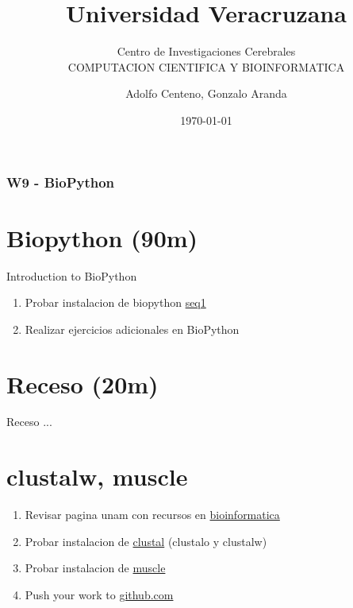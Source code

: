 \documentclass{beamer}
\begin{document}
\title{Universidad Veracruzana}  
\subtitle{Centro de Investigaciones Cerebrales\\COMPUTACION CIENTIFICA Y BIOINFORMATICA}
\author{Adolfo Centeno, Gonzalo Aranda}
\date{\today} 

\begin{frame}
\titlepage
\end{frame}

\begin{frame}\frametitle{W9 - BioPython }
\tableofcontents
\end{frame} 


\section{Biopython (90m) }

\begin{frame}

Introduction to BioPython

\begin{enumerate}

\item

	Probar instalacion de biopython \href{https://github.com/adsoftsito/python/blob/master/w9/seq1.py}{seq1} 
	
\item
	Realizar ejercicios adicionales en BioPython
	
\end{enumerate} 


\end{frame}


\section{Receso  (20m) }

\begin{frame}


Receso ...

\end{frame}


\section{clustalw, muscle }

\begin{frame}

\begin{enumerate}

\item
   Revisar pagina unam con recursos en \href{https://www.ccg.unam.mx/~vinuesa/tlem/programa_TLEM.html}{bioinformatica}
\item 
    Probar instalacion de \href{http://www.clustal.org/}{clustal} (clustalo y clustalw)
\item 
	Probar instalacion de \href{https://www.drive5.com/muscle/}{muscle}
\item
	Push your work to \href{https://github.com}{github.com}

\end{enumerate} 


\end{frame}
\end{document}
